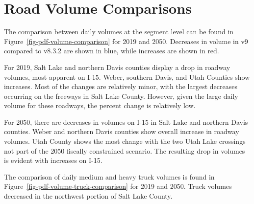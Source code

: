 \documentclass[
  letterpaper,
  DIV=11,
  numbers=noendperiod,
  titlepage=false]{scrreprt}
\begin{document}
\hypertarget{road-volume-comparisons}{%
\section{Road Volume Comparisons}\label{road-volume-comparisons}}

The comparison between daily volumes at the segment level can be found
in Figure~\ref{fig-pdf-volume-comparison} for 2019 and 2050. Decreases
in volume in v9 compared to v8.3.2 are shown in blue, while increases
are shown in red.

For 2019, Salt Lake and northern Davis counties display a drop in
roadway volumes, most apparent on I-15. Weber, southern Davis, and Utah
Counties show increases. Most of the changes are relatively minor, with
the largest decreases occurring on the freeways in Salt Lake County.
However, given the large daily volume for these roadways, the percent
change is relatively low.

For 2050, there are decreases in volumes on I-15 in Salt Lake and
northern Davis counties. Weber and northern Davis counties show overall
increase in roadway volumes. Utah County shows the most change with the
two Utah Lake crossings not part of the 2050 fiscally constrained
scenario. The resulting drop in volumes is evident with increases on
I-15.

The comparison of daily medium and heavy truck volumes is found in
Figure~\ref{fig-pdf-volume-truck-comparison} for 2019 and 2050. Truck
volumes decreased in the northwest portion of Salt Lake County.
\end{document}
